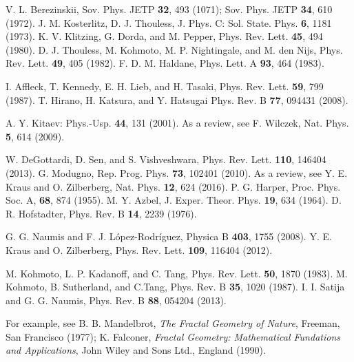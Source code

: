 \documentclass[%
superscriptaddress,
preprint,
amsmath,amssymb,
]{revtex4-1}
\begin{document}
\begin{thebibliography}{00}
 V. L. Berezinskii, Sov. Phys. JETP {\bf 32}, 493 (1071); Sov. Phys. JETP {\bf 34}, 610 (1972).
 J. M. Kosterlitz, D. J. Thouless, J. Phys. C: Sol. State. Phys. {\bf 6}, 1181 (1973).
 K. V. Klitzing, G. Dorda, and M. Pepper, Phys. Rev. Lett. {\bf 45}, 494 (1980).
 D. J. Thouless, M. Kohmoto, M. P. Nightingale, and M. den Nijs, Phys. Rev. Lett. {\bf 49}, 405 (1982).
 F. D. M. Haldane, Phys. Lett. A {\bf 93}, 464 (1983).

 I. Affleck, T. Kennedy, E. H. Lieb, and H. Tasaki, Phys. Rev. Lett. {\bf 59}, 799 (1987).
 T. Hirano, H. Katsura, and Y. Hatsugai Phys. Rev. B {\bf 77}, 094431 (2008).

 A. Y. Kitaev: Phys.-Usp. {\bf 44}, 131 (2001).
 As a review, see F. Wilczek, Nat. Phys. {\bf 5}, 614 (2009).

 W. DeGottardi, D. Sen, and S. Vishveshwara, Phys. Rev. Lett. {\bf 110}, 146404 (2013).
 G. Modugno, Rep. Prog. Phys. {\bf 73}, 102401 (2010).
 As a review, see Y. E. Kraus and O. Zilberberg, Nat. Phys. {\bf 12}, 624 (2016).
 P. G. Harper, Proc. Phys. Soc. A, {\bf 68}, 874 (1955).
 M. Y. Azbel, J. Exper. Theor. Phys. {\bf 19}, 634 (1964).
 D. R. Hofstadter, Phys. Rev. B {\bf 14}, 2239 (1976).

 G. G. Naumis and F. J. L\'opez-Rodr\'iguez, Physica B {\bf 403}, 1755 (2008).
 Y. E. Kraus and O. Zilberberg, Phys. Rev. Lett. {\bf 109}, 116404 (2012).

 M. Kohmoto, L. P. Kadanoff, and C. Tang, Phys. Rev. Lett. {\bf 50}, 1870 (1983).
 M. Kohmoto, B. Sutherland, and C.Tang, Phys. Rev. B {\bf 35}, 1020 (1987).
 I. I. Satija and G. G. Naumis, Phys. Rev. B {\bf 88}, 054204 (2013). 

 For example, see B. B. Mandelbrot, {\it The Fractal Geometry of Nature}, Freeman, San Francisco (1977); K. Falconer, {\it Fractal Geometry: Mathematical Fundations and Applications}, John Wiley and Sons Ltd., England (1990).


\end{thebibliography}
\end{document}
